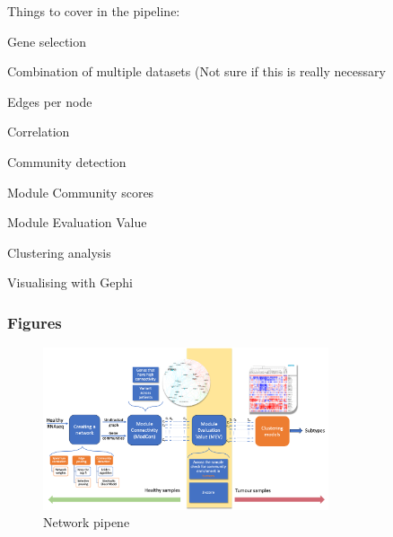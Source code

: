 \newpage
Things to cover in the pipeline:
\begin{todolist}
    \item Gene selection
    \item Combination of multiple datasets (Not sure if this is really necessary
    \item [\done] Edges per node
    \item [\done] Correlation
    \item [\done] Community detection
    \item [\done] Module Community scores
    \item [\done] Module Evaluation Value
    \item Clustering analysis
    \item Visualising with Gephi
\end{todolist}


\subsubsection{Figures} 


\begin{figure}[!htb]
    \centering\includegraphics[width=0.75\textwidth,height=0.75\textheight,keepaspectratio]{Sections/Network_I/Resources/Methods/network_pipeline.png}
    \caption{Network pipene}
    \label{fig:N_I:network_pipeline}
\end{figure}








